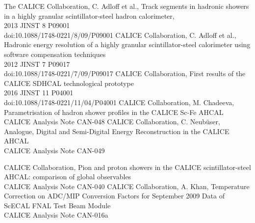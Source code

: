 \documentclass[twoside,a4paper,12pt]{article}
\begin{document}
\begin{thebibliography}{----------------}
	The CALICE Collaboration, C. Adloff et al., Track segments in hadronic showers in a highly granular scintillator-steel hadron calorimeter, \\
	2013 JINST 8 P09001\\
	doi:10.1088/1748-0221/8/09/P09001
	CALICE Collaboration, C. Adloff et al., Hadronic energy resolution of a highly granular scintillator-steel calorimeter using software compensation techniques\\
	2012  JINST 7 P09017 \\
	doi:10.1088/1748-0221/7/09/P09017
	CALICE Collaboration, First results of the CALICE SDHCAL technological prototype \\
	2016 JINST 11 P04001\\
	doi:10.1088/1748-0221/11/04/P04001
	CALICE Collaboration, M. Chadeeva, Parametrisation of hadron shower profiles in the CALICE Sc-Fe AHCAL\\
	CALICE Analysis Note CAN-048
	CALICE Collaboration, C. Neub\"user, Analogue, Digital and Semi-Digital Energy Reconstruction in the CALICE AHCAL\\
	CALICE Analysis Note CAN-049

	CALICE Collaboration, Pion and proton showers in the CALICE scintillator-steel AHCAL: comparison of global observables\\
	CALICE Analysis Note CAN-040
	CALICE Collaboration, A. Khan, Temperature Correction on ADC/MIP Conversion Factors for September 2009 Data of ScECAL FNAL Test Beam Module \\
	CALICE Analysis Note CAN-016a




	
\end{thebibliography}
\end{document}
